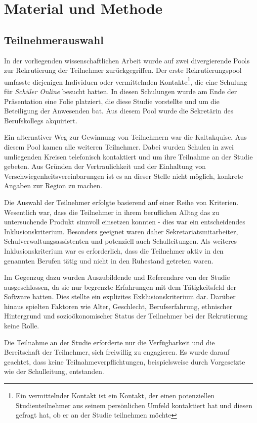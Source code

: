 \section{Material und Methode}
\subsection{Teilnehmerauswahl}

In der vorliegenden wissenschaftlichen Arbeit wurde auf zwei divergierende Pools zur Rekrutierung der Teilnehmer zurückgegriffen. Der erste Rekrutierungspool umfasste diejenigen Individuen oder vermittelnden Kontakte\footnote{Ein vermittelnder Kontakt ist ein Kontakt, der einen potenziellen Studienteilnehmer aus seinem persönlichen Umfeld kontaktiert hat und diesen gefragt hat, ob er an der Studie teilnehmen möchte}, die eine Schulung für \textit{Schüler Online} besucht hatten. In diesen Schulungen wurde am Ende der Präsentation eine Folie platziert, die diese Studie vorstellte und um die Beteiligung der Anwesenden bat. Aus diesem Pool wurde die Sekretärin des Berufskollegs akquiriert.

Ein alternativer Weg zur Gewinnung von Teilnehmern war die Kaltakquise. Aus diesem Pool kamen alle weiteren Teilnehmer. Dabei wurden Schulen in zwei umliegenden Kreisen telefonisch kontaktiert und um ihre Teilnahme an der Studie gebeten. Aus Gründen der Vertraulichkeit und der Einhaltung von Verschwiegenheitsvereinbarungen ist es an dieser Stelle nicht möglich, konkrete Angaben zur Region zu machen.

Die Auswahl der Teilnehmer erfolgte basierend auf einer Reihe von Kriterien. Wesentlich war, dass die Teilnehmer in ihrem beruflichen Alltag das zu untersuchende Produkt sinnvoll einsetzen konnten - dies war ein entscheidendes Inklusionskriterium. Besonders geeignet waren daher Sekretariatsmitarbeiter, Schulverwaltungsassistenten und potenziell auch Schulleitungen. Als weiteres Inklusionskriterium war es erforderlich, dass die Teilnehmer aktiv in den genannten Berufen tätig und nicht in den Ruhestand getreten waren.

Im Gegenzug dazu wurden Auszubildende und Referendare von der Studie ausgeschlossen, da sie nur begrenzte Erfahrungen mit dem Tätigkeitsfeld der Software hatten. Dies stellte ein explizites Exklusionskriterium dar. Darüber hinaus spielten Faktoren wie Alter, Geschlecht, Berufserfahrung, ethnischer Hintergrund und sozioökonomischer Status der Teilnehmer bei der Rekrutierung keine Rolle.

Die Teilnahme an der Studie erforderte nur die Verfügbarkeit und die Bereitschaft der Teilnehmer, sich freiwillig zu engagieren. Es wurde darauf geachtet, dass keine Teilnahmeverpflichtungen, beispielsweise durch Vorgesetzte wie der Schulleitung, entstanden.


